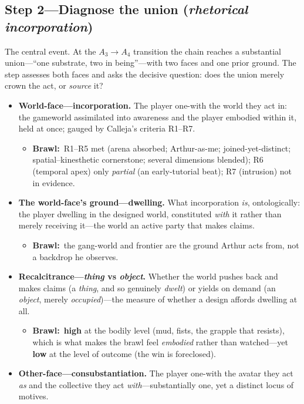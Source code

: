 \documentclass[11pt]{article}
\newcommand{\inb}{\textbf{Brawl:}~}
\newcommand{\too}{\ensuremath{\to}}
\begin{document}
\subsection*{Step 2---Diagnose the union (\emph{rhetorical incorporation})}
\noindent The central event. At the $A_3\too A_4$ transition the chain reaches a substantial union---``one substrate, two in being''---with two faces and one prior ground. The step assesses both faces and asks the decisive question: does the union merely crown the act, or \emph{source} it?
\begin{itemize}
  \item \textbf{World-face---incorporation.} The player one-with the world they act in: the gameworld assimilated into awareness and the player embodied within it, held at once; gauged by Calleja's criteria R1--R7.
    \begin{itemize}\item \inb R1--R5 met (arena absorbed; Arthur-as-me; joined-yet-distinct; spatial--kinesthetic cornerstone; several dimensions blended); R6 (temporal apex) only \emph{partial} (an early-tutorial beat); R7 (intrusion) not in evidence.\end{itemize}
  \item \textbf{The world-face's ground---dwelling.} What incorporation \emph{is}, ontologically: the player dwelling in the designed world, constituted \emph{with} it rather than merely receiving it---the world an active party that makes claims.
    \begin{itemize}\item \inb the gang-world and frontier are the ground Arthur acts from, not a backdrop he observes.\end{itemize}
  \item \textbf{Recalcitrance---\emph{thing} vs \emph{object}.} Whether the world pushes back and makes claims (a \emph{thing}, and so genuinely \emph{dwelt}) or yields on demand (an \emph{object}, merely \emph{occupied})---the measure of whether a design affords dwelling at all.
    \begin{itemize}\item \inb \textbf{high} at the bodily level (mud, fists, the grapple that resists), which is what makes the brawl feel \emph{embodied} rather than watched---yet \textbf{low} at the level of outcome (the win is foreclosed).\end{itemize}
  \item \textbf{Other-face---consubstantiation.} The player one-with the avatar they act \emph{as} and the collective they act \emph{with}---substantially one, yet a distinct locus of motives.

\end{itemize}
\end{document}
